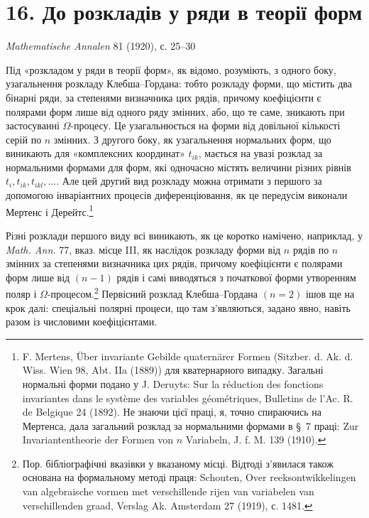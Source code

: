 \documentclass[11pt]{article}
\begin{document}

\section*{16. До розкладів у ряди в теорії форм}
\begin{center}
\emph{Mathematische Annalen} 81 (1920), с. 25--30
\end{center}

Під «розкладом у ряди в теорії форм», як відомо, розуміють, з одного боку, узагальнення розкладу Клебша--Гордана: тобто розкладу форми, що містить два бінарні ряди, за степенями визначника цих рядів, причому коефіцієнти є полярами форм лише від одного ряду змінних, або, що те саме, зникають при застосуванні \(\Omega\)-процесу. Це узагальнюється на форми від довільної кількості серій по \(n\) змінних. З другого боку, як узагальнення нормальних форм, що виникають для «комплексних координат» \(t_{ik}\), мається на увазі розклад за нормальними формами для форм, які одночасно містять величини різних рівнів \(t_i,t_{ik},t_{ikl},\ldots\). Але цей другий вид розкладу можна отримати з першого за допомогою інваріантних процесів диференціювання, як це передусім виконали Мертенс і Дерейтс.\footnote{F. Mertens, Über invariante Gebilde quaternärer Formen (Sitzber. d. Ak. d. Wiss. Wien 98, Abt. IIa (1889)) для кватернарного випадку. Загальні нормальні форми подано у J. Deruyts: Sur la réduction des fonctions invariantes dans le système des variables géométriques, Bulletins de l'Ac. R. de Belgique 24 (1892). Не знаючи цієї праці, я, точно спираючись на Мертенса, дала загальний розклад за нормальними формами в \S~7 праці: Zur Invariantentheorie der Formen von \(n\) Variabeln, J. f. M. 139 (1910).}

Різні розклади першого виду всі виникають, як це коротко намічено, наприклад, у \emph{Math. Ann.} 77, вказ. місце III, як наслідок розкладу форми від \(n\) рядів по \(n\) змінних за степенями визначника цих рядів, причому коефіцієнти є полярами форм лише від \((n-1)\) рядів і самі виводяться з початкової форми утворенням поляр і \(\Omega\)-процесом.\footnote{Пор. бібліографічні вказівки у вказаному місці. Відтоді з'явилася також основана на формальному методі праця: Schouten, Over reeksontwikkelingen van algebraische vormen met verschillende rijen van variabelen van verschillenden graad, Verslag Ak. Amsterdam 27 (1919), с. 1481.} Первісний розклад Клебша--Гордана \((n=2)\) ішов ще на крок далі: спеціальні полярні процеси, що там з'являються, задано явно, навіть разом із числовими коефіцієнтами.
\end{document}
